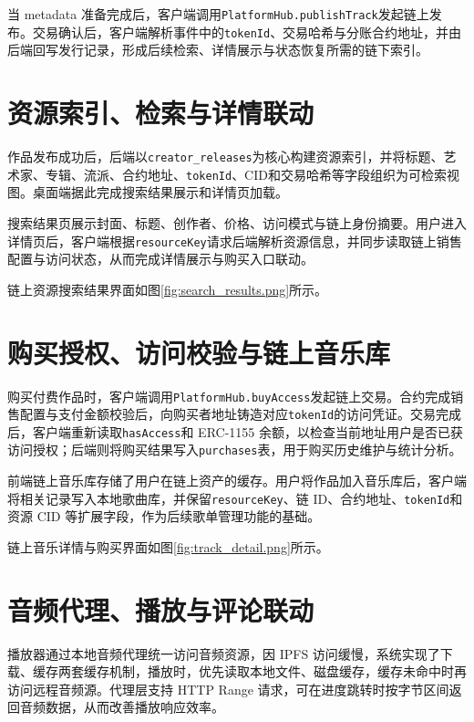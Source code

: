 当 metadata 准备完成后，客户端调用\texttt{PlatformHub.publishTrack}发起链上发布。交易确认后，客户端解析事件中的\texttt{tokenId}、交易哈希与分账合约地址，并由后端回写发行记录，形成后续检索、详情展示与状态恢复所需的链下索引。

\section{资源索引、检索与详情联动}

作品发布成功后，后端以\texttt{creator\_releases}为核心构建资源索引，并将标题、艺术家、专辑、流派、合约地址、\texttt{tokenId}、CID和交易哈希等字段组织为可检索视图。桌面端据此完成搜索结果展示和详情页加载。

搜索结果页展示封面、标题、创作者、价格、访问模式与链上身份摘要。用户进入详情页后，客户端根据\texttt{resourceKey}请求后端解析资源信息，并同步读取链上销售配置与访问状态，从而完成详情展示与购买入口联动。

链上资源搜索结果界面如图\ref{fig:search_results.png}所示。


\section{购买授权、访问校验与链上音乐库}

购买付费作品时，客户端调用\texttt{PlatformHub.buyAccess}发起链上交易。合约完成销售配置与支付金额校验后，向购买者地址铸造对应\texttt{tokenId}的访问凭证。交易完成后，客户端重新读取\texttt{hasAccess}和 ERC-1155 余额，以检查当前地址用户是否已获访问授权；后端则将购买结果写入\texttt{purchases}表，用于购买历史维护与统计分析。

前端链上音乐库存储了用户在链上资产的缓存。用户将作品加入音乐库后，客户端将相关记录写入本地歌曲库，并保留\texttt{resourceKey}、链 ID、合约地址、\texttt{tokenId}和资源 CID 等扩展字段，作为后续歌单管理功能的基础。

链上音乐详情与购买界面如图\ref{fig:track_detail.png}所示。


\section{音频代理、播放与评论联动}

播放器通过本地音频代理统一访问音频资源，因 IPFS 访问缓慢，系统实现了下载、缓存两套缓存机制，播放时，优先读取本地文件、磁盘缓存，缓存未命中时再访问远程音频源。代理层支持 HTTP Range 请求，可在进度跳转时按字节区间返回音频数据，从而改善播放响应效率。

